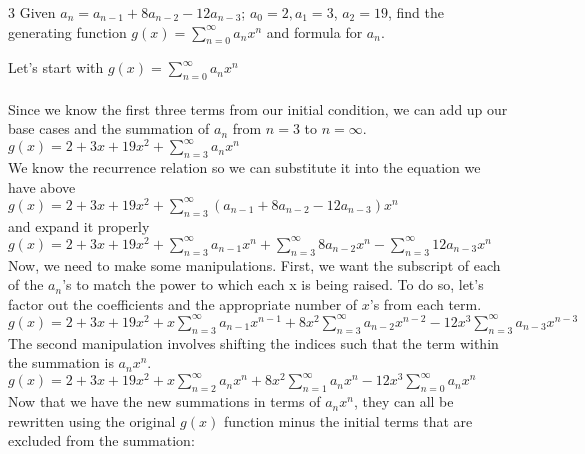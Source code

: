 \documentclass[11pt,twosided]{article}
\begin{document}
\begin{problem} 3
Given $a_n = a_{n-1} + 8a_{n-2} - 12a_{n-3}$; $a_0 = 2, a_1 = 3$, $a_2 = 19$, find the generating function $g(x) = \sum_{n = 0}^\infty a_nx^n$ and formula for $a_n$.
\end{problem}
\begin{solution}

\noindent Let's start with $g(x) = \sum_{n = 0}^\infty a_nx^n$\\\\
\noindent
Since we know the first three terms from our initial condition, we can add up our base cases and the summation of $a_n$ from $n=3$ to $n=\infty$. \\

$g(x) = 2 + 3x + 19x^2 + \sum_{n = 3}^\infty a_nx^n$ \\

\noindent
We know the recurrence relation so we can substitute it into the equation we have above\\

$g(x) = 2 + 3x + 19x^2 + \sum_{n = 3}^\infty (a_{n-1} + 8a_{n-2} - 12a_{n-3})x^n$\\

\noindent
and expand it properly\\

$g(x) = 2 + 3x + 19x^2 + \sum_{n = 3}^\infty a_{n-1}x^n + \sum_{n = 3}^\infty 8a_{n-2}x^n - \sum_{n = 3}^\infty 12a_{n-3}x^n$ \\

\noindent
Now, we need to make some manipulations. First, we want the subscript of each of the $a_n$'s to match the power to which each x is being raised. To do so, let's factor out the coefficients and the appropriate number of $x$'s from each term.\\

$g(x) = 2 + 3x + 19x^2 + x\sum_{n = 3}^\infty a_{n-1}x^{n-1} + 8x^2\sum_{n = 3}^\infty a_{n-2}x^{n-2} - 12x^3\sum_{n = 3}^\infty a_{n-3}x^{n-3}$ \\

\noindent
The second manipulation involves shifting the indices such that the term within the summation is $a_nx^n$. \\

$g(x) = 2 + 3x + 19x^2 + x\sum_{n = 2}^\infty a_{n}x^{n} + 8x^2\sum_{n = 1}^\infty a_{n}x^{n} - 12x^3\sum_{n = 0}^\infty a_{n}x^{n}$ \\

\noindent
Now that we have the new summations in terms of $a_nx^n$, they can all be rewritten using the original $g(x)$ function minus the initial terms that are excluded from the summation:\\


\end{solution}
\end{document}
